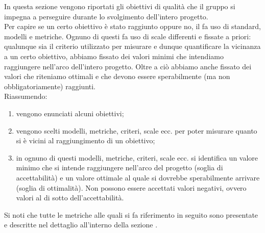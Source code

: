 	 \label{sec:obiettivi}
		In questa sezione vengono riportati gli obiettivi di qualità che il gruppo \groupname{} si impegna a perseguire durante lo svolgimento dell'intero progetto.\\
		Per capire se un certo obiettivo è stato raggiunto oppure no, il \groupname{} fa uso di standard, modelli e metriche. Ognuno di questi fa uso di scale differenti e fissate a priori: qualunque sia il criterio utilizzato per misurare e dunque quantificare la vicinanza a un certo obiettivo, abbiamo fissato dei valori minimi che intendiamo raggiungere nell'arco dell'intero progetto. Oltre a ciò abbiamo anche fissato dei valori che riteniamo ottimali e che devono essere sperabilmente (ma non obbligatoriamente) raggiunti.\\
		Riassumendo:
		\begin{enumerate}
			\item vengono enunciati alcuni obiettivi;
			\item vengono scelti modelli, metriche, criteri, scale ecc. per poter misurare quanto si è vicini al raggiungimento di un obiettivo;
			\item in ognuno di questi modelli, metriche, criteri, scale ecc. si identifica un valore minimo che si intende raggiungere nell'arco del progetto (soglia di accettabilità) e un valore ottimale al quale si dovrebbe sperabilmente arrivare (soglia di ottimalità). Non possono essere accettati valori negativi, ovvero valori al di sotto dell'accettabilità. 
		\end{enumerate}
		Si noti che tutte le metriche alle quali si fa riferimento in seguito sono presentate e descritte nel dettaglio all'interno della sezione .

